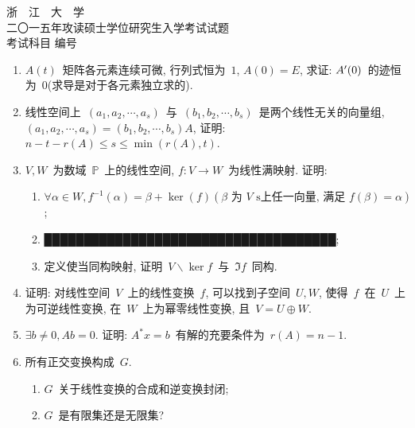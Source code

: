 \documentclass[UTF8,a4paper,11pt]{article}
\begin{document}
\newpage
\setcounter{page}{1}

\begin{center}
	{\Huge 浙~~江~~大~~学}\\
	\setlength{\parskip}{5pt}
	{\Large 二〇一五年攻读硕士学位研究生入学考试试题}\\
	\setlength{\parskip}{10 pt}
	{\Large 考试科目\underline{} 编号\underline{}}
\end{center}

\begin{enumerate}
	\item $A(t)$~矩阵各元素连续可微, 行列式恒为~$1$, $A(0)=E$, 求证: $A\rq{}(0)$~的迹恒为~$0$(求导是对于各元素独立求的).
	      \vspace{2em}
	\item 线性空间上~$(a_1,a_2,\cdots,a_s)$~与~$(b_1,b_2,\cdots,b_s)$~是两个线性无关的向量组, $(a_1,a_2,\cdots,a_s)=(b_1,b_2,\cdots,b_s)A$, 证明: $n-t-r(A)\leqslant s\leqslant \min(r(A),t)$.
	      \vspace{2em}
	\item $V,W$~为数域~$\mathbb{P}$~上的线性空间, $f:V\to W$~为线性满映射. 证明:
	      \begin{enumerate}
		      \item $\forall\alpha\in W, f^{-1}(\alpha)=\beta+\ker(f) (\text{$\beta$~为~$V$~s上任一向量, 满足~$f(\beta)=\alpha$})$;
		      \item █████████████████████████████████████;
		      \item 定义使当同构映射, 证明~$V\backslash\ker{f}$~与~$\Im f$~同构.
	      \end{enumerate}
	      \vspace{2em}
	\item 证明: 对线性空间~$V$~上的线性变换~$f$, 可以找到子空间~$U,W$, 使得~$f$~在~$U$~上为可逆线性变换, 在~$W$~上为幂零线性变换, 且~$V=U\oplus W$.
	      \vspace{2em}
	\item $\exists b\neq 0, Ab=0$. 证明: $A^{*}x=b$~有解的充要条件为~$r(A)=n-1$.
	      \vspace{2em}
	\item 所有正交变换构成~$G$.
	      \begin{enumerate}
		      \item $G$~关于线性变换的合成和逆变换封闭;
		      \item $G$~是有限集还是无限集?

\end{enumerate}
\end{enumerate}
\end{document}
